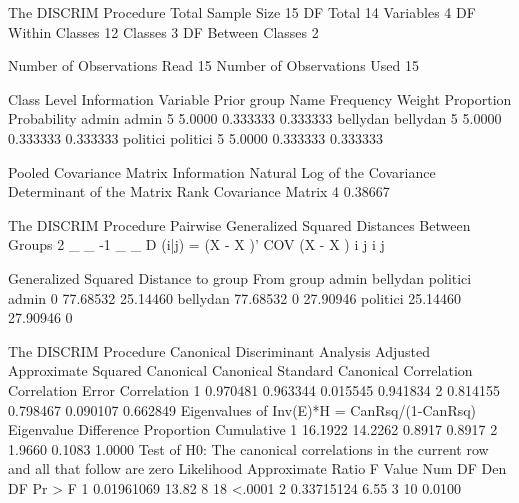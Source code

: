 \documentclass{article}
\begin{document}
\begin{Woutput}
The DISCRIM Procedure
Total Sample Size       15          DF Total                14
Variables                4          DF Within Classes       12
Classes                  3          DF Between Classes       2

Number of Observations Read             15
Number of Observations Used             15

                          Class Level Information
            Variable                                                  Prior
group       Name        Frequency       Weight    Proportion    Probability
admin       admin               5       5.0000      0.333333       0.333333
bellydan    bellydan            5       5.0000      0.333333       0.333333
politici    politici            5       5.0000      0.333333       0.333333

Pooled Covariance Matrix Information
               Natural Log of the
 Covariance    Determinant of the
Matrix Rank     Covariance Matrix
          4               0.38667

The DISCRIM Procedure
Pairwise Generalized Squared Distances Between Groups
 2         _   _       -1  _   _
D (i|j) = (X - X )' COV   (X - X )
            i   j           i   j

      Generalized Squared Distance to group
From
group            admin      bellydan      politici
admin                0      77.68532      25.14460
bellydan      77.68532             0      27.90946
politici      25.14460      27.90946             0

The DISCRIM Procedure
Canonical Discriminant Analysis
                              Adjusted    Approximate        Squared
              Canonical      Canonical       Standard      Canonical
            Correlation    Correlation          Error    Correlation
       1       0.970481       0.963344       0.015545       0.941834
       2       0.814155       0.798467       0.090107       0.662849
                           Eigenvalues of Inv(E)*H
                             = CanRsq/(1-CanRsq)
            Eigenvalue    Difference    Proportion    Cumulative
       1       16.1922       14.2262        0.8917        0.8917
       2        1.9660                      0.1083        1.0000
                  Test of H0: The canonical correlations in the
                    current row and all that follow are zero
            Likelihood    Approximate
                 Ratio        F Value    Num DF    Den DF    Pr > F
       1    0.01961069          13.82         8        18    <.0001
       2    0.33715124           6.55         3        10    0.0100


\end{Woutput}
\end{document}
